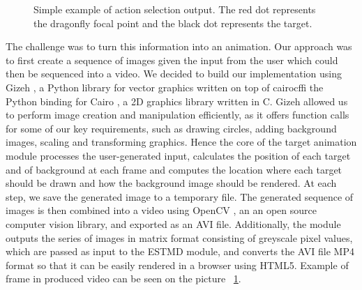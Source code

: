 \documentclass[a4paper,11pt]{article}
\begin{document}
\begin{figure}[h]
\begin{minipage}{0.2\textwidth}
\end{minipage}
\begin{minipage}{0.2\textwidth}
\end{minipage}
\caption{Simple example of action selection output. The red dot represents the dragonfly focal point and the black dot represents the target.}
\label{target_animation_example}
\end{figure}

The challenge was to turn this information into an animation. Our approach was to first create a sequence of images given the input from the user which could then be sequenced into a video. We decided to build our implementation using Gizeh \cite{gizeh}, a Python library for vector graphics written on top of cairocffi \cite{cairocffi} the Python binding for Cairo \cite{cairo}, a 2D graphics library written in C. Gizeh allowed us to perform image creation and manipulation efficiently, as it offers function calls for some of our key requirements, such as drawing circles, adding background images, scaling and transforming graphics. Hence the core of the target animation module processes the user-generated input, calculates the position of each target and of background at each frame and computes the location where each target should be drawn and how the background image should be rendered. At each step, we save the generated image to a temporary file. The generated sequence of images is then combined into a video using OpenCV \cite{opencv}, an an open source computer vision library, and exported as an AVI file. Additionally, the module outputs the series of images in matrix format consisting of greyscale pixel values, which are passed as input to the ESTMD module, and converts the AVI file MP4 format so that it can be easily rendered in a browser using HTML5.
\newline
\newline
Example of frame in produced video can be seen on the picture  ~\ref{target_animation_example}.
\end{document}
